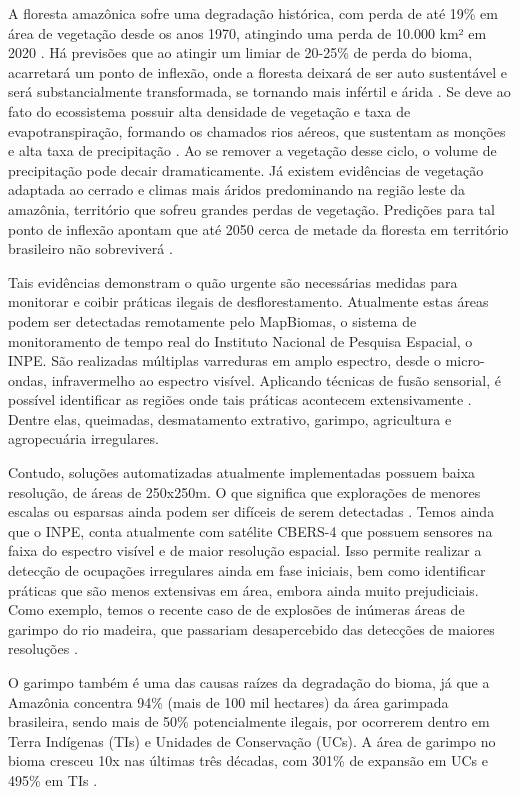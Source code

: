A floresta amazônica sofre uma degradação histórica, com perda de até 19\% em área de vegetação desde os anos 1970, atingindo uma perda de 10.000 km² em 2020 \cite{ignacioNature}. Há previsões que ao atingir um limiar de 20-25\% de perda do bioma, acarretará um ponto de inflexão, onde a floresta deixará de ser auto sustentável e será substancialmente transformada, se tornando mais infértil e árida \cite{LovejoyTipping}. Se deve ao fato do ecossistema possuir alta densidade de vegetação e  taxa de evapotranspiração, formando os chamados rios aéreos, que sustentam as monções e alta taxa de precipitação \cite{satyamurty2013moisture}. Ao se remover a vegetação desse ciclo, o volume de  precipitação pode decair dramaticamente. Já existem evidências \cite{ignacioNature} de vegetação adaptada ao cerrado e climas mais áridos predominando na região leste da amazônia, território que sofreu grandes perdas de vegetação. Predições para tal ponto de inflexão apontam que até 2050 cerca de metade da floresta em território brasileiro não sobreviverá \cite{LovejoyTipping}.

Tais evidências demonstram o quão urgente são necessárias medidas para monitorar e coibir práticas ilegais de desflorestamento. Atualmente estas áreas podem ser detectadas remotamente pelo MapBiomas, o sistema de monitoramento de tempo real do Instituto Nacional de Pesquisa Espacial, o INPE. São realizadas múltiplas varreduras em amplo espectro, desde o micro-ondas, infravermelho ao espectro visível. Aplicando técnicas de fusão sensorial, é possível identificar as regiões onde tais práticas acontecem extensivamente \cite{inpe_deter}. Dentre elas, queimadas, desmatamento extrativo, garimpo, agricultura e agropecuária irregulares.

Contudo, soluções automatizadas atualmente implementadas possuem baixa resolução, de áreas de 250x250m. O que significa que explorações de menores escalas ou esparsas ainda podem ser difíceis de serem detectadas  \cite{mapbiomasgarimpo}. Temos ainda que o INPE, conta atualmente com satélite CBERS-4 que possuem sensores na faixa do espectro visível e de maior resolução espacial. Isso permite realizar a detecção de ocupações irregulares ainda em fase iniciais, bem como identificar práticas que são menos extensivas em área, embora ainda muito prejudiciais. Como exemplo, temos o recente caso de de explosões de inúmeras áreas de garimpo do rio madeira, que passariam desapercebido das detecções de maiores resoluções \cite{mapbiomasgarimpo}.


O garimpo também é uma das causas raízes da degradação do bioma, já que a Amazônia concentra 94\% (mais de 100 mil hectares) da área garimpada brasileira, sendo mais de 50\% potencialmente ilegais, por ocorrerem dentro em Terra Indígenas (TIs) e Unidades de Conservação (UCs). A área de garimpo no bioma cresceu 10x nas últimas três décadas, com 301\% de expansão em UCs e 495\% em TIs \cite{mapbiomasgarimpo}.


